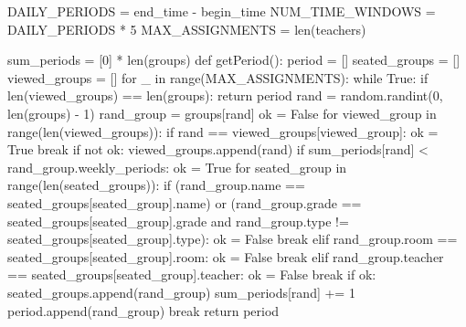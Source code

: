 \documentclass[12pt,a4paper]{report}
\begin{document}
\begin{python}
DAILY_PERIODS = end_time - begin_time
NUM_TIME_WINDOWS = DAILY_PERIODS * 5
MAX_ASSIGNMENTS = len(teachers)


sum_periods = [0] * len(groups)
def getPeriod():
    period = []
    seated_groups = []
    viewed_groups = []
    for _ in range(MAX_ASSIGNMENTS):
        while True:
            if len(viewed_groups) == len(groups):
                return period
            rand = random.randint(0, len(groups) - 1)
            rand_group = groups[rand]
            ok = False
            for viewed_group in range(len(viewed_groups)):
                if rand == viewed_groups[viewed_group]:
                    ok = True
                    break
            if not ok:
                viewed_groups.append(rand)
                if sum_periods[rand] < rand_group.weekly_periods:
                    ok = True
                    for seated_group in range(len(seated_groups)):
                        if (rand_group.name == seated_groups[seated_group].name) or (rand_group.grade == seated_groups[seated_group].grade and rand_group.type != seated_groups[seated_group].type):
                            ok = False
                            break
                        elif rand_group.room == seated_groups[seated_group].room:
                            ok = False
                            break
                        elif rand_group.teacher == seated_groups[seated_group].teacher:
                            ok = False
                            break
                    if ok:
                        seated_groups.append(rand_group)
                        sum_periods[rand] += 1
                        period.append(rand_group)
                        break
    return period
\end{python}
\end{document}
